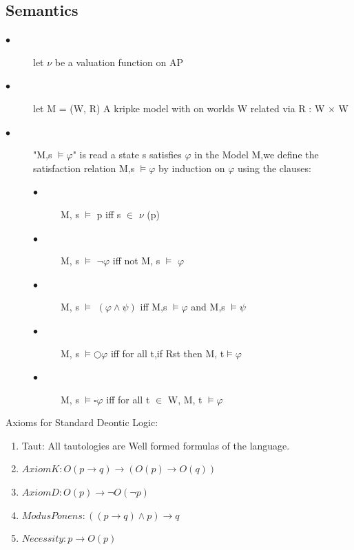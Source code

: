 \documentclass{article}
\begin{document}
\subsection{Semantics}
\begin{description}
\item[$\bullet$ ] let $\nu$ be a valuation function on AP
\item[$\bullet $]  let M = (W, R) A kripke model with on worlds W related via R : W × W
\item[$\bullet $]  "M,s $ \vDash \varphi$" is read a state s satisfies $\varphi$ in the Model M,we define the satisfaction relation M,s $ \vDash \varphi$ by induction on $\varphi$ using the clauses:
\begin{description}
\item[$\bullet$ ]M, s $ \vDash $ p iff s $\in$ $\nu$  (p)
\item[$\bullet$ ]M, s $ \vDash $ $\neg \varphi$ iff not M, s $ \vDash $ $\varphi$
\item[$\bullet$ ]M, s $ \vDash $ $(\varphi\land\psi )$ iff M,s $ \vDash \varphi$ and  M,s $ \vDash \psi$
\item[$\bullet$ ]M, s $ \vDash  \bigcirc\varphi$ iff for all t,if Rst then M, t$\vDash \varphi$
\item[$\bullet$ ]M, s $ \vDash  \square\varphi$ iff for all t $\in$ W, M, t $\vDash \varphi$
\end{description}
\end{description}
Axioms for Standard Deontic Logic:
\begin{enumerate}
\item Taut: All tautologies are Well formed formulas of the language.
\item  $Axiom K: O(p \to q) \to (O(p) \to O(q)) $
\item $ Axiom D: O(p) \to \neg O(\neg p)$
\item $Modus Ponens: ((p \to q) \land p) \to q $
\item $ Necessity: p \to O(p)$
\end{enumerate}
\end{document}
